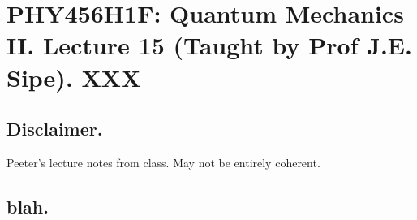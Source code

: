 
%

\chapter{PHY456H1F: Quantum Mechanics II.  Lecture 15 (Taught by Prof J.E. Sipe).  XXX}
\label{chap:qmTwoL15}
{}
\date{Oct 31, 2011}

\beginArtWithToc

\section{Disclaimer.}

Peeter's lecture notes from class.  May not be entirely coherent.

\section{blah.}

\cite{desai2009quantum}

\EndArticle
